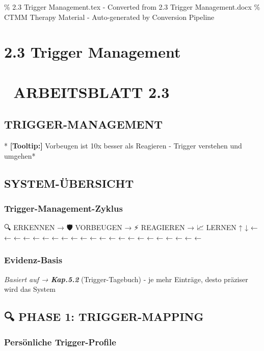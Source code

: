 \% 2.3 Trigger Management.tex - Converted from 2.3 Trigger Management.docx
\% CTMM Therapy Material - Auto-generated by Conversion Pipeline

\section{2.3 Trigger Management}
\label{sec:2-3-trigger-management}

\section{🎢 \textbf{ARBEITSBLATT 2.3}}
\subsection{\textbf{TRIGGER-MANAGEMENT}}

*\textcolor{ctmmYellow}{} \textbf{[Tooltip:]} Vorbeugen ist 10x besser als Reagieren -
\textcolor{ctmmRed}{Trigger} verstehen und umgehen*

\subsection{\textcolor{ctmmGreen}{} \textbf{SYSTEM-ÜBERSICHT}}

\subsubsection{\textbf{\textcolor{ctmmRed}{Trigger}-Management-Zyklus}}

🔍 ERKENNEN → 🛡️ VORBEUGEN → ⚡ REAGIEREN → 📈 LERNEN
↑                                           ↓
← ← ← ← ← ← ← ← ← ← ← ← ← ← ← ← ← ← ← ← ← ←

\subsubsection{\textbf{Evidenz-Basis}}

\textit{\textcolor{ctmmYellow}{} Basiert auf → \textcolor{ctmmBlue}{} \textbf{Kap.5.2}}\* (\textcolor{ctmmRed}{Trigger}-Tagebuch) - je mehr
Einträge, desto präziser wird das System\*

\subsection{🔍 \textbf{PHASE 1: TRIGGER-MAPPING}}

\subsubsection{\textbf{Persönliche \textcolor{ctmmRed}{Trigger}-Profile}}

